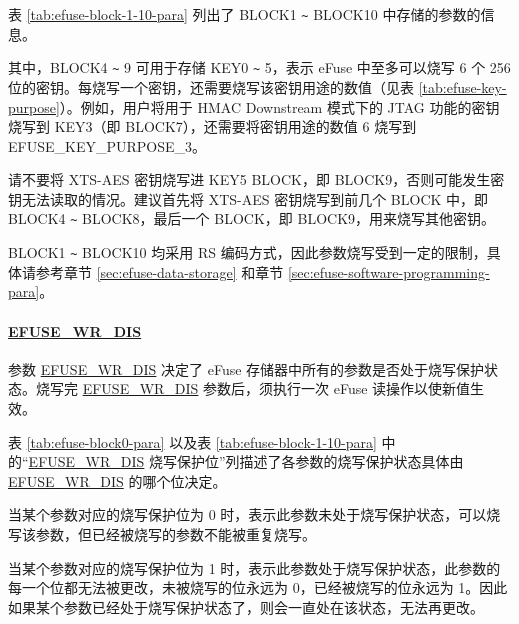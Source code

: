 \documentclass[main\_\_CN.tex]{subfiles}
\begin{document}



\clearpage
\begin{landscape}
表 \ref{tab:efuse-block-1-10-para} 列出了 BLOCK1 \verb+~+ BLOCK10 中存储的参数的信息。
    


其中，BLOCK4 \verb+~+ 9 可用于存储 KEY0 \verb+~+ 5，表示 eFuse 中至多可以烧写 6 个 256 位的密钥。每烧写一个密钥，还需要烧写该密钥用途的数值（见表 \ref{tab:efuse-key-purpose}）。例如，用户将用于 HMAC Downstream 模式下的 JTAG 功能的密钥烧写到 KEY\textcolor{myred}{3}（即 BLOCK7），还需要将密钥用途的数值 6 烧写到 EFUSE\_KEY\_PURPOSE\_\textcolor{myred}{3}。

\begin{tiplisting}
请不要将 XTS-AES 密钥烧写进 KEY5 BLOCK，即 BLOCK9，否则可能发生密钥无法读取的情况。建议首先将 XTS-AES 密钥烧写到前几个 BLOCK 中，即 BLOCK4 \verb+~+ BLOCK8，最后一个 BLOCK，即 BLOCK9，用来烧写其他密钥。
\end{tiplisting}


BLOCK1 \verb+~+ BLOCK10 均采用 RS 编码方式，因此参数烧写受到一定的限制，具体请参考章节 \ref{sec:efuse-data-storage} 和章节 \ref{sec:efuse-software-programming-para}。

\end{landscape}

\paragraph{\hyperref[fielddesc:EFUSEWRDIS]{EFUSE\_WR\_DIS}}
\label{sec:efuse-wr-dis}

参数 \hyperref[fielddesc:EFUSEWRDIS]{EFUSE\_WR\_DIS} 决定了 eFuse 存储器中所有的参数是否处于烧写保护状态。烧写完 \hyperref[fielddesc:EFUSEWRDIS]{EFUSE\_WR\_DIS} 参数后，须执行一次 eFuse 读操作以使新值生效。

表 \ref{tab:efuse-block0-para} 以及表 \ref{tab:efuse-block-1-10-para} 中的“\hyperref[fielddesc:EFUSEWRDIS]{EFUSE\_WR\_DIS} 烧写保护位”列描述了各参数的烧写保护状态具体由 \hyperref[fielddesc:EFUSEWRDIS]{EFUSE\_WR\_DIS} 的哪个位决定。

当某个参数对应的烧写保护位为 0 时，表示此参数未处于烧写保护状态，可以烧写该参数，但已经被烧写的参数不能被重复烧写。

当某个参数对应的烧写保护位为 1 时，表示此参数处于烧写保护状态，此参数的每一个位都无法被更改，未被烧写的位永远为 0，已经被烧写的位永远为 1。因此如果某个参数已经处于烧写保护状态了，则会一直处在该状态，无法再更改。
\end{document}

